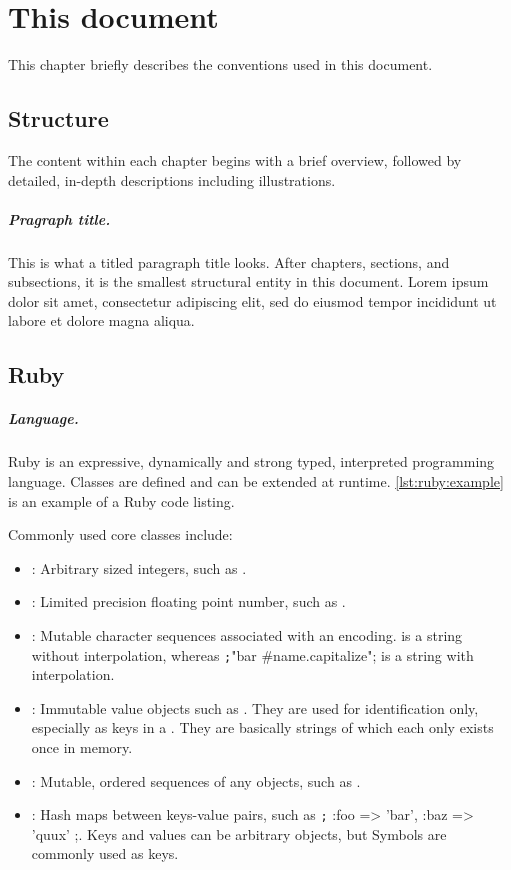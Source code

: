 \chapter{This document}
This chapter briefly describes the conventions used in this document.

\section{Structure}
The content within each chapter begins with a brief overview,
followed by detailed, in-depth descriptions including illustrations.

\paragraph*{Pragraph title.} This is what a titled paragraph title looks. After
chapters, sections, and subsections, it is the smallest structural entity in
this document.
Lorem ipsum dolor sit amet, consectetur adipiscing elit, sed do
eiusmod tempor incididunt ut labore et dolore magna aliqua.

\section{Ruby}
\paragraph*{Language.} Ruby is an expressive, dynamically and strong typed, interpreted
programming language. Classes are defined and can be extended at runtime.
\autoref{lst:ruby:example} is an example of a Ruby code listing.

Commonly used core classes include:
\begin{itemize}
	\item {}:
		Arbitrary sized integers, such as .
	\item {}:
		Limited precision floating point number, such as .
	\item {}:
		Mutable character sequences associated with an encoding.
		 is a string without interpolation, whereas
		\texttt;"bar #{name.capitalize}"; is a string with interpolation.
	\item {}:
		Immutable value objects such as . They are used for identification only,
		especially as keys in a . They are basically strings of
		which each only exists once in memory.
	\item {}:
		Mutable, ordered sequences of any objects, such as .
	\item {}:
		Hash maps between keys-value pairs, such as
		\texttt;{ :foo => 'bar', :baz => 'quux' };.
		Keys and values can be arbitrary objects, but Symbols are
		commonly used as keys.
\end{itemize}

